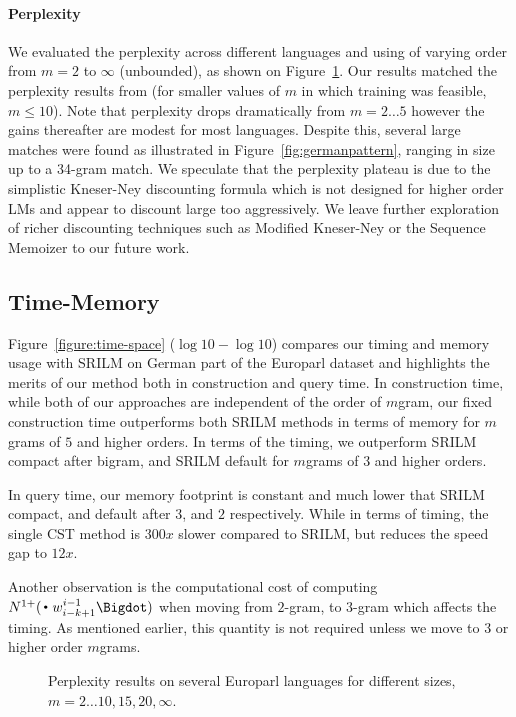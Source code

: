 \paragraph{Perplexity}
We evaluated the perplexity across different languages and using \ngrams of varying order from $m=2$ to $\infty$ (unbounded), as shown on Figure~\ref{figure:pplx}.
Our results matched the perplexity results from \SRILM (for smaller values of $m$ in which \SRILM training was feasible, $m \le 10$).
Note that perplexity drops dramatically from $m=2\ldots5$ however the gains thereafter are modest for most languages.
Despite this, several large \ngram matches were found as illustrated in Figure~\ref{fig:germanpattern}, ranging in size up to a 34-gram match.
We speculate that the perplexity plateau is due to the simplistic Kneser-Ney discounting formula which is not designed for higher order \ngram LMs and appear to discount large \ngrams too aggressively. 
We leave further exploration of richer discounting techniques such as Modified Kneser-Ney \cite{chen_goodman} or the Sequence Memoizer \cite{wood_teh} to our future work.

\subsection{Time-Memory}
Figure~\ref{figure:time-space} ($\log10-\log10$) compares our timing and memory usage with SRILM on German part of the Europarl dataset and highlights the merits of our method both in construction and query time. In construction time, while both of our approaches are independent of the order of $m$gram, our fixed construction time outperforms both SRILM methods in terms of memory for $m$grams of $5$ and higher orders. In terms of the timing, we outperform SRILM compact after bigram, and SRILM default for $m$grams of $3$ and higher orders.

In query time, our memory footprint is constant and much lower that SRILM compact, and default after $3$, and $2$ respectively. While in terms of timing, the single CST method is $300x$ slower compared to SRILM, but reduces the speed gap to $12x$.  

Another observation is the computational cost of computing $\nlplus{\Bigcdot w_{i-k+1}^{i-1} \Bigdot}$ when moving from $2$-gram, to $3$-gram which affects the timing. As mentioned earlier, this quantity is not required unless we move to $3$ or higher order $m$grams.

\begin{figure}

\caption{Perplexity results on several Europarl languages for different \ngram sizes, $m=2\ldots10,15,20,\infty$.}
\label{figure:pplx}
\end{figure}

